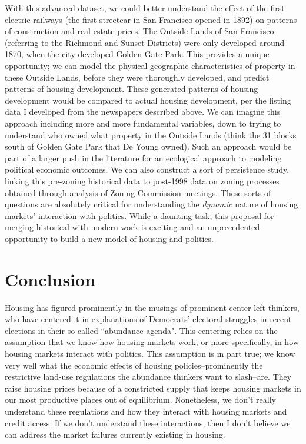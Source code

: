 \documentclass{article}[11pt]
\begin{document}
With this advanced dataset, we could better understand the effect of the first electric railways (the first streetcar in San Francisco opened in 1892) on patterns of construction and real estate prices. The Outside Lands of San Francisco (referring to the Richmond and Sunset Districts) were only developed around 1870, when the city developed Golden Gate Park. This provides a unique opportunity; we can model the physical geographic characteristics of property in these Outside Lands, before they were thoroughly developed, and predict patterns of housing development. These generated patterns of housing development would be compared to actual housing development, per the listing data I developed from the newspapers described above. We can imagine this approach including more and more fundamental variables, down to trying to understand who owned what property in the Outside Lands (think the 31 blocks south of Golden Gate Park that De Young owned). Such an approach would be part of a larger push in the literature for an ecological approach to modeling political economic outcomes. \citep{haber2021ecological} We can also construct a sort of persistence study, linking this pre-zoning historical data to post-1998 data on zoning processes obtained through analysis of Zoning Commission meetings. These sorts of questions are absolutely critical for understanding the \textit{dynamic} nature of housing markets' interaction with politics. While a daunting task, this proposal for merging historical with modern work is exciting and an unprecedented opportunity to build a new model of housing and politics.

\section{Conclusion}

Housing has figured prominently in the musings of prominent center-left thinkers, who have centered it in explanations of Democrats' electoral struggles in recent elections in their so-called ``abundance agenda". This centering relies on the assumption that we know how housing markets work, or more specifically, in how housing markets interact with politics. This assumption is in part true; we know very well what the economic effects of housing policies--prominently the restrictive land-use regulations the abundance thinkers want to slash--are. They raise housing prices because of a constricted supply that keeps housing markets in our most productive places out of equilibrium. Nonetheless, we don't really understand these regulations and how they interact with housing markets and credit access. If we don't understand these interactions, then I don't believe we can address the market failures currently existing in housing. 
\end{document}
